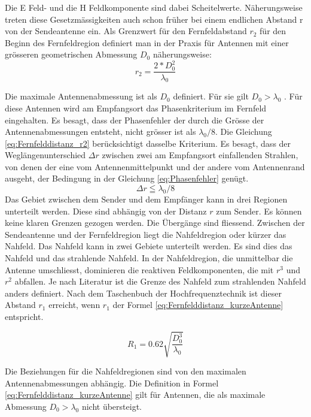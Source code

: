 Die E Feld- und die H Feldkomponente sind dabei Scheitelwerte.
Näherungsweise treten diese Gesetzmässigkeiten auch schon früher bei einem endlichen Abstand r von der Sendeantenne ein. Als Grenzwert für den Fernfeldabstand $r_{2}$ für den Beginn des Fernfeldregion  definiert man in der Praxis für Antennen mit einer grösseren geometrischen Abmessung $D_{0}$ näherungsweise\cite{meinke1992taschenbuch}:
\begin{equation}
r_{2}=\dfrac{2*D_{0}^{2}}{\lambda_{0}} \label{eq:Fernfelddistanz_r2}
\end{equation}

Die maximale Antennenabmessung ist als $D_{0}$ definiert. Für sie gilt $D_{0}>\lambda_{0}$ . Für diese Antennen wird am Empfangsort das Phasenkriterium im Fernfeld eingehalten. Es besagt, dass der Phasenfehler der durch die Grösse der Antennenabmessungen entsteht, nicht grösser ist als $\lambda_{0}/8$.  Die Gleichung \ref{eq:Fernfelddistanz_r2} berücksichtigt dasselbe Kriterium. Es besagt, dass der Weglängenunterschied $\Delta r$ zwischen zwei am Empfangsort einfallenden Strahlen, von denen der eine vom Antennenmittelpunkt und der andere vom Antennenrand ausgeht, der Bedingung in der Gleichung \ref{eq:Phasenfehler} genügt\cite{meinke1992taschenbuch}.
\begin{equation}
\Delta r\leqq\lambda_{0}/8 \label{eq:Phasenfehler}
\end{equation}
Das Gebiet zwischen dem Sender und dem Empfänger kann in drei Regionen unterteilt werden. Diese sind abhängig von der Distanz $r$ zum Sender. Es können keine klaren Grenzen gezogen werden. Die Übergänge sind fliessend. Zwischen der Sendeantenne und der Fernfeldregion liegt die Nahfeldregion oder kürzer das Nahfeld. Das Nahfeld kann in zwei Gebiete unterteilt werden. Es sind dies das Nahfeld und das strahlende Nahfeld. In der  Nahfeldregion, die unmittelbar die Antenne umschliesst, dominieren die reaktiven Feldkomponenten, die mit $r^{3}$ und $r^{2}$ abfallen.  Je nach Literatur ist die Grenze des Nahfeld zum strahlenden Nahfeld anders definiert. Nach dem Taschenbuch der Hochfrequenztechnik ist dieser Abstand $r_{1}$ erreicht, wenn $r_{1}$ der Formel \ref{eq:Fernfelddistanz_kurzeAntenne} entspricht\cite{meinke1992taschenbuch}.

\begin{equation}
R_{1}=0.62\sqrt{\dfrac{D_{0}^{3}}{\lambda_{0}}} \label{eq:Fernfelddistanz_kurzeAntenne}
\end{equation}

Die Beziehungen für die Nahfeldregionen sind von den maximalen Antennenabmessungen abhängig.  Die Definition in Formel \ref{eq:Fernfelddistanz_kurzeAntenne} gilt für Antennen, die als maximale Abmessung $D_{0}>\lambda_{0}$ nicht übersteigt.

